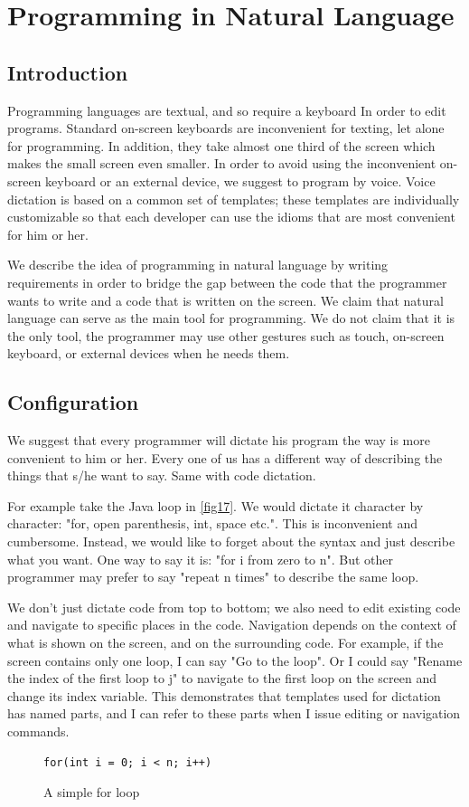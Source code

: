 \chapter{Programming in Natural Language}
\section{Introduction}
Programming languages are textual, and so require a keyboard In order to edit programs. Standard on-screen keyboards are inconvenient for texting, let alone for programming. In addition, they take almost one third of the screen which makes the small screen even smaller. In order to avoid using the inconvenient on-screen keyboard or an external device, we suggest to program by voice. Voice dictation is based on a common set of templates; these templates are individually customizable so that each developer can use the idioms that are most convenient for him or her.

We describe the idea of programming in natural language by writing requirements in order to bridge the gap between the code that the programmer wants to write and a code that is written on the screen. We claim that natural language can serve as the main tool for programming. We do not claim that it is the only tool, the programmer may use other gestures such as touch, on-screen keyboard, or external devices when he needs them.

\section{Configuration}
We suggest that every programmer will dictate his program the way is more convenient to him or her. Every one of us has a different way of describing the things that s/he want to say. Same with code dictation.

For example take the Java loop in \autoref{fig17}. We would dictate it character by character: "for, open parenthesis, int, space etc.". This is inconvenient and cumbersome. Instead, we would like to forget about the syntax and just describe what you want. One way to say it is: "for i from zero to n". But other programmer may prefer to say "repeat n times" to describe the same loop.

We don't just dictate code from top to bottom; we also need to edit existing code and navigate to specific places in the code. Navigation depends on the context of what is shown on the screen, and on the surrounding code. For example, if the screen contains only one loop, I can say "Go to the loop". Or I could say "Rename the index of the first loop to j" to navigate to the first loop on the screen and change its index variable. This demonstrates that templates used for dictation has named parts, and I can refer to these parts when I issue editing or navigation commands.
\begin{figure}[H]
\begin{lstlisting}
for(int i = 0; i < n; i++)
\end{lstlisting}
\caption{A simple for loop}
\label{fig17}
\end{figure}
